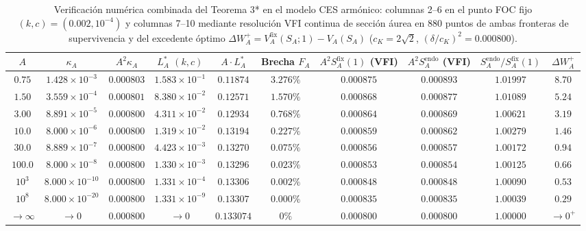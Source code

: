 \documentclass[11pt,letterpaper]{article}
\theoremstyle{plain}
\begin{document}
\begin{table}[htbp]
\centering
\scriptsize
\setlength{\tabcolsep}{3.2pt}
\begin{tabular}{@{}cccccccccc@{}}
\toprule
$A$ & $\kappa_A$ & $A^2\kappa_A$ & $L^*_A$ $(k,c)$ & $A\cdot L^*_A$ & Brecha $F_A$ & $A^2 S_A^{\mathrm{fix}}(1)$ (VFI) & $A^2 S_A^{\mathrm{endo}}$ (VFI) & $S_A^{\mathrm{endo}}/S_A^{\mathrm{fix}}(1)$ & $\Delta W_A^+$ \\
\midrule
$0.75$ & $1.428\times 10^{-3}$ & $0.000803$ & $1.583\times 10^{-1}$ & $0.11874$ & $3.276\%$ & $0.000875$ & $0.000893$ & \textbf{$1.01997$} & $8.70$ \\
$1.50$ & $3.559\times 10^{-4}$ & $0.000801$ & $8.380\times 10^{-2}$ & $0.12571$ & $1.570\%$ & $0.000868$ & $0.000877$ & \textbf{$1.01089$} & $5.24$ \\
$3.00$ & $8.891\times 10^{-5}$ & $0.000800$ & $4.311\times 10^{-2}$ & $0.12934$ & $0.768\%$ & $0.000864$ & $0.000869$ & \textbf{$1.00621$} & $3.19$ \\
$10.0$ & $8.000\times 10^{-6}$ & $0.000800$ & $1.319\times 10^{-2}$ & $0.13194$ & $0.227\%$ & $0.000859$ & $0.000862$ & \textbf{$1.00279$} & $1.46$ \\
$30.0$ & $8.889\times 10^{-7}$ & $0.000800$ & $4.423\times 10^{-3}$ & $0.13270$ & $0.075\%$ & $0.000856$ & $0.000857$ & \textbf{$1.00172$} & $0.94$ \\
$100.0$ & $8.000\times 10^{-8}$ & $0.000800$ & $1.330\times 10^{-3}$ & $0.13296$ & $0.023\%$ & $0.000853$ & $0.000854$ & \textbf{$1.00125$} & $0.66$ \\
$10^3$ & $8.000\times 10^{-10}$ & $0.000800$ & $1.331\times 10^{-4}$ & $0.13306$ & $0.002\%$ & $0.000848$ & $0.000848$ & \textbf{$1.00090$} & $0.53$ \\
$10^8$ & $8.000\times 10^{-20}$ & $0.000800$ & $1.331\times 10^{-9}$ & $0.13307$ & $0.000\%$ & $0.000835$ & $0.000835$ & \textbf{$1.00039$} & $0.29$ \\
\midrule
$\to\infty$ & $\to 0$ & \textbf{$0.000800$} & $\to 0$ & \textbf{$0.133074$} & \textbf{$0\%$} & \textbf{$0.000800$} & \textbf{$0.000800$} & \textbf{$1.00000$} & $\to 0^+$ \\
\bottomrule
\end{tabular}
\caption{Verificación numérica combinada del Teorema 3* en el modelo CES armónico: columnas 2--6 en el punto FOC fijo $(k,c)=(0.002, 10^{-4})$ y columnas 7--10 mediante resolución VFI continua de sección áurea en $880$ puntos de ambas fronteras de supervivencia y del excedente óptimo $\Delta W_A^+ = V_A^{\mathrm{fix}}(S_A; 1) - V_A(S_A)$ ($c_K=2\sqrt{2}$, $(\delta/c_K)^2=0.000800$).}
\end{table}
\end{document}
